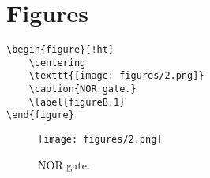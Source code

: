 \chapter{Figures}

\begin{verbatim}
\begin{figure}[!ht] 
    \centering
    \texttt{[image: figures/2.png]} 
    \caption{NOR gate.}
    \label{figureB.1}
\end{figure}
\end{verbatim}

\begin{figure}[!ht] 
	\centering
	\texttt{[image: figures/2.png]} 
	\caption{NOR gate.}
	\label{figureB.1}
\end{figure}
